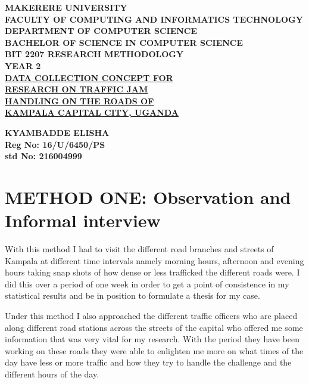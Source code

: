 \documentclass[a4paper,12pt]{article}
\begin{document}
\begin{center}
\begin{normalsize}

\textbf{{\Huge MAKERERE UNIVERSITY} } \\
\vspace{1cm}
\textbf{{\Large FACULTY OF COMPUTING AND INFORMATICS TECHNOLOGY}} \\
\vspace{1cm}
\textbf{DEPARTMENT OF COMPUTER SCIENCE} \\
\textbf{BACHELOR OF SCIENCE IN COMPUTER SCIENCE} \\
\vspace{1cm}
\textbf{BIT 2207 RESEARCH METHODOLOGY} \\
\textbf{YEAR 2} \\

\vspace{4cm}
\textbf{\underline{{\Large DATA COLLECTION CONCEPT FOR}}\\
\vspace{0.5cm}
\underline{{\Large RESEARCH ON TRAFFIC JAM}}\\
\vspace{0.5cm}
\underline{{\Large HANDLING ON THE ROADS OF}}\\
\vspace{0.5cm}
\underline{{\Large KAMPALA CAPITAL CITY, UGANDA}}\\}

\vspace{3cm}
\textbf{\sc KYAMBADDE ELISHA } \\
\textbf{\sc Reg No: 16/U/6450/PS } \\
\textbf{\sc std No: 216004999}\\
\vfill 
\end{normalsize}
\end{center}
\newpage

 
\section{METHOD ONE: Observation and Informal interview}
With this method I had to visit the different road branches and streets of Kampala at different time intervals namely morning hours, afternoon and evening hours taking snap shots of how dense or less trafficked the different roads were. I did this over a period of one week in order to get a point of consistence in my statistical results and be in position to formulate a thesis for my case.

Under this method I also approached the different traffic officers who are placed along different road stations across the streets of the capital who offered me some information that was very vital for my research. With the period they have been working on these roads they were able to enlighten me more on what times of the day have less or more traffic and how they try to handle the challenge and the different hours of the day.
 
\end{document}

